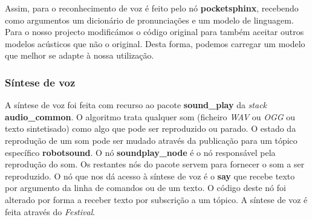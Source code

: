\documentclass[journal]{IEEEtran}
\begin{document}

Assim, para o reconhecimento de voz é feito pelo nó \textbf{pocketsphinx}, recebendo como argumentos um dicionário de pronunciações e um modelo de linguagem. Para o nosso projecto modificámos o código original para também aceitar outros modelos acústicos que não o original. Desta forma, podemos carregar um modelo que melhor se adapte à nossa utilização.


\subsubsection{Síntese de voz}

A síntese de voz foi feita com recurso ao pacote \textbf{sound_play} da \textit{stack} \textbf{audio_common}. O algoritmo trata qualquer som (ficheiro \emph{WAV} ou \emph{OGG} ou texto sintetisado) como algo que pode ser reproduzido ou parado. O estado da reprodução de um som pode ser mudado através da publicação para um tópico específico \textbf{robotsound}. O nó \textbf{soundplay_node} é o nó responsável pela reprodução do som. Os restantes nós do pacote servem para fornecer o som a ser reproduzido. O nó que nos dá acesso à síntese de voz é o \textbf{say} que recebe texto por argumento da linha de comandos ou de um texto. O código deste nó foi alterado por forma a receber texto por subscrição a um tópico. A síntese de voz é feita através do \emph{Festival}.
\end{document}
